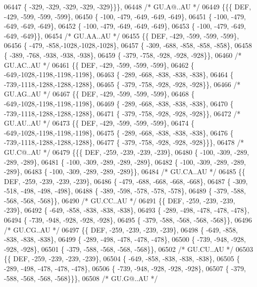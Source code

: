 \begin{DoxyCode}
06447 \{ -329, -329, -329, -329, -329\}\}\},
06448 \textcolor{comment}{/* GU.A@..AU */}
06449 \{\{\{  DEF, -429, -599, -599, -599\},
06450 \{ -100, -479, -649, -649, -649\},
06451 \{ -100, -479, -649, -649, -649\},
06452 \{ -100, -479, -649, -649, -649\},
06453 \{ -100, -479, -649, -649, -649\}\},
06454 \textcolor{comment}{/* GU.AA..AU */}
06455 \{\{  DEF, -429, -599, -599, -599\},
06456 \{ -479, -858,-1028,-1028,-1028\},
06457 \{ -309, -688, -858, -858, -858\},
06458 \{ -389, -768, -938, -938, -938\},
06459 \{ -379, -758, -928, -928, -928\}\},
06460 \textcolor{comment}{/* GU.AC..AU */}
06461 \{\{  DEF, -429, -599, -599, -599\},
06462 \{ -649,-1028,-1198,-1198,-1198\},
06463 \{ -289, -668, -838, -838, -838\},
06464 \{ -739,-1118,-1288,-1288,-1288\},
06465 \{ -379, -758, -928, -928, -928\}\},
06466 \textcolor{comment}{/* GU.AG..AU */}
06467 \{\{  DEF, -429, -599, -599, -599\},
06468 \{ -649,-1028,-1198,-1198,-1198\},
06469 \{ -289, -668, -838, -838, -838\},
06470 \{ -739,-1118,-1288,-1288,-1288\},
06471 \{ -379, -758, -928, -928, -928\}\},
06472 \textcolor{comment}{/* GU.AU..AU */}
06473 \{\{  DEF, -429, -599, -599, -599\},
06474 \{ -649,-1028,-1198,-1198,-1198\},
06475 \{ -289, -668, -838, -838, -838\},
06476 \{ -739,-1118,-1288,-1288,-1288\},
06477 \{ -379, -758, -928, -928, -928\}\}\},
06478 \textcolor{comment}{/* GU.C@..AU */}
06479 \{\{\{  DEF, -259, -239, -239, -239\},
06480 \{ -100, -309, -289, -289, -289\},
06481 \{ -100, -309, -289, -289, -289\},
06482 \{ -100, -309, -289, -289, -289\},
06483 \{ -100, -309, -289, -289, -289\}\},
06484 \textcolor{comment}{/* GU.CA..AU */}
06485 \{\{  DEF, -259, -239, -239, -239\},
06486 \{ -479, -688, -668, -668, -668\},
06487 \{ -309, -518, -498, -498, -498\},
06488 \{ -389, -598, -578, -578, -578\},
06489 \{ -379, -588, -568, -568, -568\}\},
06490 \textcolor{comment}{/* GU.CC..AU */}
06491 \{\{  DEF, -259, -239, -239, -239\},
06492 \{ -649, -858, -838, -838, -838\},
06493 \{ -289, -498, -478, -478, -478\},
06494 \{ -739, -948, -928, -928, -928\},
06495 \{ -379, -588, -568, -568, -568\}\},
06496 \textcolor{comment}{/* GU.CG..AU */}
06497 \{\{  DEF, -259, -239, -239, -239\},
06498 \{ -649, -858, -838, -838, -838\},
06499 \{ -289, -498, -478, -478, -478\},
06500 \{ -739, -948, -928, -928, -928\},
06501 \{ -379, -588, -568, -568, -568\}\},
06502 \textcolor{comment}{/* GU.CU..AU */}
06503 \{\{  DEF, -259, -239, -239, -239\},
06504 \{ -649, -858, -838, -838, -838\},
06505 \{ -289, -498, -478, -478, -478\},
06506 \{ -739, -948, -928, -928, -928\},
06507 \{ -379, -588, -568, -568, -568\}\}\},
06508 \textcolor{comment}{/* GU.G@..AU */}

\end{DoxyCode}
